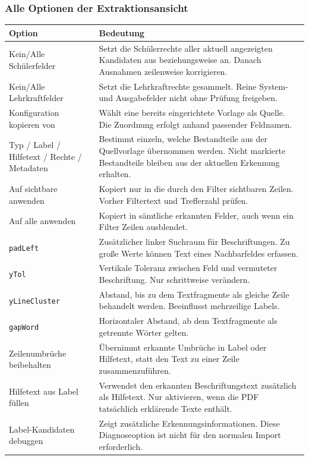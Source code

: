 \documentclass[12pt,a4paper]{article}
\begin{document}
\subsubsection*{Alle Optionen der Extraktionsansicht}
\small
\begin{longtable}{|p{}|p{}|}
\hline
\textbf{Option} & \textbf{Bedeutung}\\
\hline
Kein/Alle Schülerfelder & Setzt die Schülerrechte aller aktuell angezeigten Kandidaten aus beziehungsweise an. Danach Ausnahmen zeilenweise korrigieren.\\
\hline
Kein/Alle Lehrkraftfelder & Setzt die Lehrkraftrechte gesammelt. Reine System- und Ausgabefelder nicht ohne Prüfung freigeben.\\
\hline
Konfiguration kopieren von & Wählt eine bereits eingerichtete Vorlage als Quelle. Die Zuordnung erfolgt anhand passender Feldnamen.\\
\hline
Typ / Label / Hilfetext / Rechte / Metadaten & Bestimmt einzeln, welche Bestandteile aus der Quellvorlage übernommen werden. Nicht markierte Bestandteile bleiben aus der aktuellen Erkennung erhalten.\\
\hline
Auf sichtbare anwenden & Kopiert nur in die durch den Filter sichtbaren Zeilen. Vorher Filtertext und Trefferzahl prüfen.\\
\hline
Auf alle anwenden & Kopiert in sämtliche erkannten Felder, auch wenn ein Filter Zeilen ausblendet.\\
\hline
\texttt{padLeft} & Zusätzlicher linker Suchraum für Beschriftungen. Zu große Werte können Text eines Nachbarfeldes erfassen.\\
\hline
\texttt{yTol} & Vertikale Toleranz zwischen Feld und vermuteter Beschriftung. Nur schrittweise verändern.\\
\hline
\texttt{yLineCluster} & Abstand, bis zu dem Textfragmente als gleiche Zeile behandelt werden. Beeinflusst mehrzeilige Labels.\\
\hline
\texttt{gapWord} & Horizontaler Abstand, ab dem Textfragmente als getrennte Wörter gelten.\\
\hline
Zeilenumbrüche beibehalten & Übernimmt erkannte Umbrüche in Label oder Hilfetext, statt den Text zu einer Zeile zusammenzuführen.\\
\hline
Hilfetext aus Label füllen & Verwendet den erkannten Beschriftungstext zusätzlich als Hilfetext. Nur aktivieren, wenn die PDF tatsächlich erklärende Texte enthält.\\
\hline
Label-Kandidaten debuggen & Zeigt zusätzliche Erkennungsinformationen. Diese Diagnoseoption ist nicht für den normalen Import erforderlich.\\

\end{longtable}
\end{document}
